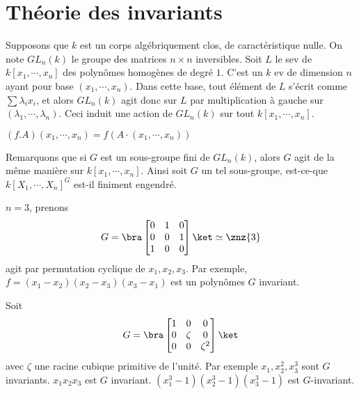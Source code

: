     \section{Théorie des invariants}
        Supposons que $k$ est un corps algébriquement clos, de caractéristique nulle. On note $GL_n(k)$ le groupe des matrices $n \times n$ inversibles. Soit $L$ le sev de $k[x_1, \cdots, x_n]$ des polynômes homogènes de degré $1$. C'est un $k$ ev de dimension $n$ ayant pour base $(x_1, \cdots, x_n)$. Dans cette base, tout élément de $L$ s'écrit comme $\sum \lambda_ix_i$, et alors $GL_n(k)$ agit donc sur $L$ par multiplication à gauche sur $(\lambda_1, \cdots, \lambda_n)$. Ceci induit une action de $GL_n(k)$ sur tout $k[x_1, \cdots, x_n]$.
        \begin{nota}
            $(f.A)(x_1, \cdots, x_n) = f(A \cdot (x_1, \cdots, x_n))$
        \end{nota}
        Remarquons que si $G$ est un sous-groupe fini de $GL_n(k)$, alors $G$ agit de la même manière sur $k[x_1, \cdots, x_n]$. Ainsi soit $G$ un tel sous-groupe, est-ce-que $k[X_1, \cdots, X_n]^G$ est-il finiment engendré.
        \begin{expl}
            $n = 3$, prenons
            \begin{align*}
                G = \bra
                \begin{bmatrix}
                    0 & 1 & 0 \\
                    0 & 0 & 1 \\
                    1 & 0 & 0 \\
                \end{bmatrix} \ket \simeq \znz{3}
            \end{align*}
            agit par permutation cyclique de $x_1, x_2, x_3$. Par exemple, $f = (x_1 - x_2)(x_2 - x_3)(x_3 - x_1)$ est un polynômes $G$ invariant.
        \end{expl}
        \begin{expl}
            Soit 
            \begin{align*}
                G = \bra
                \begin{bmatrix}
                    1 & 0 & 0 \\
                    0 & \zeta & 0 \\
                    0 & 0 & \zeta^2 \\
                \end{bmatrix} \ket
            \end{align*}
            avec $\zeta$ une racine cubique primitive de l'unité. Par exemple $x_1,x_2^2,x_3^3$ sont $G$ invariants. $x_1x_2x_3$ est $G$ invariant. $(x_1^3 - 1)(x_2^3 - 1)(x_3^3 - 1)$ est $G$-invariant.
        \end{expl}
